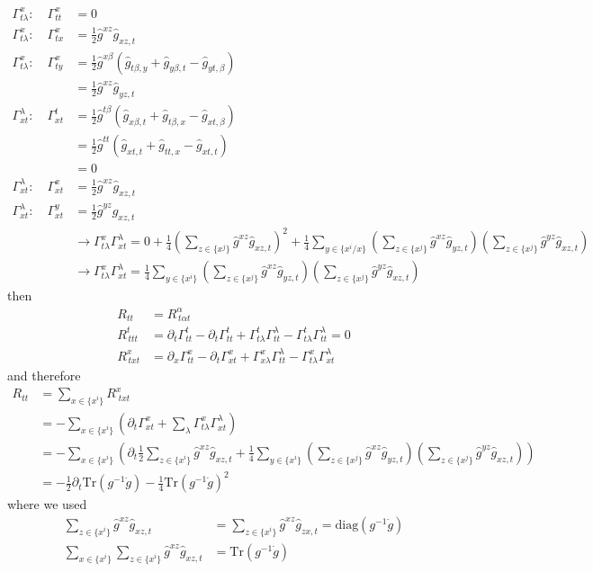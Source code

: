 \documentclass[10pt,a4paper]{book}
\theoremstyle{definition}
\begin{document}
\begin{align}
\Gamma^x_{t\lambda}:\quad\Gamma^x_{tt}&=0\\
\Gamma^x_{t\lambda}:\quad\Gamma^x_{tx}
&=\frac{1}{2}\hat{g}^{xz}\hat{g}_{xz,t}\\
\Gamma^x_{t\lambda}:\quad\Gamma^x_{ty}
&=\frac{1}{2}\hat{g}^{x\beta}(\hat{g}_{t\beta,y}+\hat{g}_{y\beta,t}-\hat{g}_{yt,\beta})\\
&=\frac{1}{2}\hat{g}^{xz}\hat{g}_{yz,t}\\
\Gamma^\lambda_{xt}:\quad\Gamma^t_{xt}&=\frac{1}{2}\hat{g}^{t\beta}(\hat{g}_{x\beta,t}+\hat{g}_{t\beta,x}-\hat{g}_{xt,\beta})\\
&=\frac{1}{2}\hat{g}^{tt}(\hat{g}_{xt,t}+\hat{g}_{tt,x}-\hat{g}_{xt,t})\\
&=0\\
\Gamma^\lambda_{xt}:\quad\Gamma^x_{xt}&=\frac{1}{2}\hat{g}^{xz}\hat{g}_{xz,t}\\
\Gamma^\lambda_{xt}:\quad\Gamma^y_{xt}&=\frac{1}{2}\hat{g}^{yz}\hat{g}_{xz,t}\\
&\rightarrow \Gamma^x_{t\lambda}\Gamma^\lambda_{xt}=0+\frac{1}{4}\left(\sum_{z\in\{x^j\}}\hat{g}^{xz}\hat{g}_{xz,t}\right)^2+\frac{1}{4}\sum_{y\in\{x^i/x\}}\left(\sum_{z\in\{x^j\}}\hat{g}^{xz}\hat{g}_{yz,t}\right)\left(\sum_{z\in\{x^j\}}\hat{g}^{yz}\hat{g}_{xz,t}\right)\\
&\rightarrow \Gamma^x_{t\lambda}\Gamma^\lambda_{xt}=\frac{1}{4}\sum_{y\in\{x^i\}}\left(\sum_{z\in\{x^j\}}\hat{g}^{xz}\hat{g}_{yz,t}\right)\left(\sum_{z\in\{x^j\}}\hat{g}^{yz}\hat{g}_{xz,t}\right)
\end{align}
then
\begin{align}
R_{tt}&=R^\alpha_{\,t\alpha t}\\
R^t_{\,ttt}&=\partial_t\Gamma^t_{tt}-\partial_t\Gamma^t_{tt}+\Gamma^t_{t\lambda}\Gamma^\lambda_{tt}-\Gamma^t_{t\lambda}\Gamma^\lambda_{tt}=0\\
R^x_{\,txt}&=\partial_x\Gamma^x_{tt}-\partial_t\Gamma^x_{xt}+\Gamma^x_{x\lambda}\Gamma^\lambda_{tt}-\Gamma^x_{t\lambda}\Gamma^\lambda_{xt}
\end{align}
and therefore
\begin{align}
R_{tt}
&=\sum_{x\in\{x^i\}}R^x_{\;txt}\\
&=-\sum_{x\in\{x^i\}}\left(\partial_t\Gamma^x_{xt}
+\sum_\lambda\Gamma^x_{t\lambda}\Gamma^\lambda_{xt}\right)\\
&=-\sum_{x\in\{x^i\}}\left(\partial_t
\frac{1}{2}\sum_{z\in\{x^i\}}\hat{g}^{xz}\hat{g}_{xz,t}+\frac{1}{4}\sum_{y\in\{x^i\}}\left(\sum_{z\in\{x^j\}}\hat{g}^{xz}\hat{g}_{yz,t}\right)\left(\sum_{z\in\{x^j\}}\hat{g}^{yz}\hat{g}_{xz,t}\right)\right)\\
&=-\frac{1}{2}\partial_t\text{Tr}(g^{-1}\dot{g})-\frac{1}{4}\text{Tr}(g^{-1}\dot{g})^2
\end{align}
where we used
\begin{align}
\sum_{z\in\{x^i\}}\hat{g}^{xz}\hat{g}_{xz,t}
&=\sum_{z\in\{x^i\}}\hat{g}^{xz}\hat{g}_{zx,t}=\text{diag}(g^{-1}\dot{g})\\
\sum_{x\in\{x^i\}}\sum_{z\in\{x^i\}}\hat{g}^{xz}\hat{g}_{xz,t}
&=\text{Tr}(g^{-1}\dot{g})
\end{align}
\end{document}
